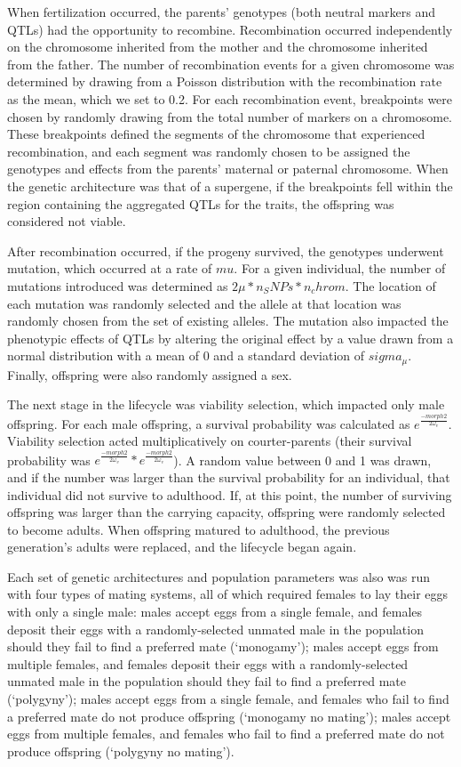\documentclass[
  11pt,
]{article}
\begin{document}
When fertilization occurred, the parents' genotypes (both neutral
markers and QTLs) had the opportunity to recombine. Recombination
occurred independently on the chromosome inherited from the mother and
the chromosome inherited from the father. The number of recombination
events for a given chromosome was determined by drawing from a Poisson
distribution with the recombination rate as the mean, which we set to
0.2. For each recombination event, breakpoints were chosen by randomly
drawing from the total number of markers on a chromosome. These
breakpoints defined the segments of the chromosome that experienced
recombination, and each segment was randomly chosen to be assigned the
genotypes and effects from the parents' maternal or paternal chromosome.
When the genetic architecture was that of a supergene, if the
breakpoints fell within the region containing the aggregated QTLs for
the traits, the offspring was considered not viable.

After recombination occurred, if the progeny survived, the genotypes
underwent mutation, which occurred at a rate of \(mu\). For a given
individual, the number of mutations introduced was determined as
\(2\mu*n_SNPs*n_chrom\). The location of each mutation was randomly
selected and the allele at that location was randomly chosen from the
set of existing alleles. The mutation also impacted the phenotypic
effects of QTLs by altering the original effect by a value drawn from a
normal distribution with a mean of 0 and a standard deviation of
\(sigma_\mu\). Finally, offspring were also randomly assigned a sex.

The next stage in the lifecycle was viability selection, which impacted
only male offspring. For each male offspring, a survival probability was
calculated as \(e^{\frac{-morph2}{2\omega_v}}\). Viability selection acted
multiplicatively on courter-parents (their survival probability was
\(e^{\frac{-morph2}{2\omega_v}}*e^{\frac{-morph2}{2\omega_v}}\)). A random
value between 0 and 1 was drawn, and if the number was larger than the
survival probability for an individual, that individual did not survive
to adulthood. If, at this point, the number of surviving offspring was
larger than the carrying capacity, offspring were randomly selected to
become adults. When offspring matured to adulthood, the previous
generation's adults were replaced, and the lifecycle began again.

Each set of genetic architectures and population parameters was also was
run with four types of mating systems, all of which required females to
lay their eggs with only a single male: males accept eggs from a single
female, and females deposit their eggs with a randomly-selected unmated
male in the population should they fail to find a preferred mate
(`monogamy'); males accept eggs from multiple females, and females
deposit their eggs with a randomly-selected unmated male in the
population should they fail to find a preferred mate (`polygyny'); males
accept eggs from a single female, and females who fail to find a
preferred mate do not produce offspring (`monogamy no mating'); males
accept eggs from multiple females, and females who fail to find a
preferred mate do not produce offspring (`polygyny no mating').
\end{document}
